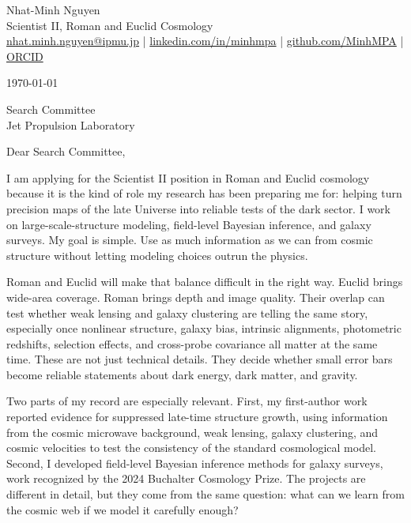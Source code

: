 \documentclass[11pt,letterpaper]{article}
\begin{document}
\begin{center}
    {\Huge Nhat-Minh Nguyen} \\
    \vspace{0.06cm}
    {\color{UI_blue} \Large Scientist II, Roman and Euclid Cosmology} \\
    \vspace{0.08cm}
    \large
    \href{mailto:nhat.minh.nguyen@ipmu.jp}{nhat.minh.nguyen@ipmu.jp}
    \quad | \quad
    \href{https://linkedin.com/in/minhmpa}{linkedin.com/in/minhmpa}
    \quad | \quad
    \href{https://github.com/MinhMPA}{github.com/MinhMPA} \quad | \quad \href{https://orcid.org/0000-0002-2542-7233}{ORCID}

\vspace{0.05cm}
{\color{UI_blue} \hrulefill}
\end{center}

\justify
\setlength{\parindent}{0pt}
\setlength{\parskip}{8.5pt}
\vspace{-0.05cm}

\today

Search Committee \\
Jet Propulsion Laboratory

Dear Search Committee,

I am applying for the Scientist II position in Roman and Euclid cosmology because it is the kind of role my research has been preparing me for: helping turn precision maps of the late Universe into reliable tests of the dark sector. I work on large-scale-structure modeling, field-level Bayesian inference, and galaxy surveys. My goal is simple. Use as much information as we can from cosmic structure without letting modeling choices outrun the physics.

Roman and Euclid will make that balance difficult in the right way. Euclid brings wide-area coverage. Roman brings depth and image quality. Their overlap can test whether weak lensing and galaxy clustering are telling the same story, especially once nonlinear structure, galaxy bias, intrinsic alignments, photometric redshifts, selection effects, and cross-probe covariance all matter at the same time. These are not just technical details. They decide whether small error bars become reliable statements about dark energy, dark matter, and gravity.

Two parts of my record are especially relevant. First, my first-author work reported evidence for suppressed late-time structure growth, using information from the cosmic microwave background, weak lensing, galaxy clustering, and cosmic velocities to test the consistency of the standard cosmological model. Second, I developed field-level Bayesian inference methods for galaxy surveys, work recognized by the 2024 Buchalter Cosmology Prize. The projects are different in detail, but they come from the same question: what can we learn from the cosmic web if we model it carefully enough?
\end{document}

